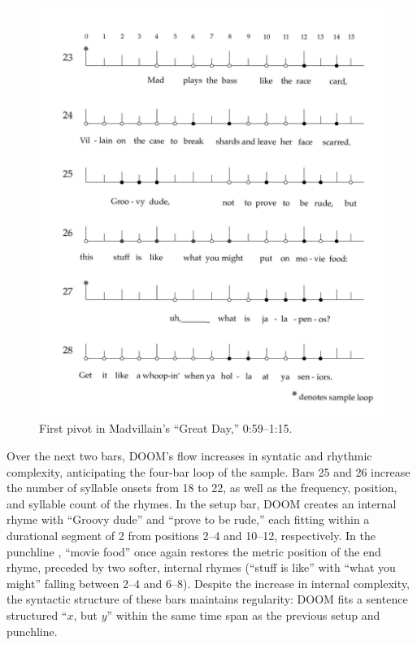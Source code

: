     \begin{figure}[!ht]
        \centering
        \includegraphics{images/figures/chp 03/059115greatdayfirstpivot.pdf}
        \caption{First pivot in Madvillain's ``Great Day,'' 0:59--1:15.}
        \label{fig:doomfirstpiv}
    \end{figure}

Over the next two bars, DOOM's flow increases in syntatic and rhythmic complexity, anticipating
the four-bar loop of the sample. Bars 25 and 26 increase the number of syllable onsets from 18 
to 22, as well as the  frequency, position, and syllable count of the rhymes. In the setup bar, 
DOOM creates an internal  rhyme with ``Groovy dude'' and ``prove to  be rude,'' each fitting 
within a durational segment of 2 from positions 2--4 and 10--12, respectively. In the punchline
, ``movie food'' once again restores the metric position of the end rhyme, preceded by two softer,
internal rhymes (``stuff is like'' with ``what you might'' falling between 2--4 and 6--8). Despite 
the increase in internal complexity, the  syntactic structure of these bars maintains regularity:
DOOM fits a sentence structured ``$x$, but $y$'' within the same time span as the previous setup 
and punchline.

